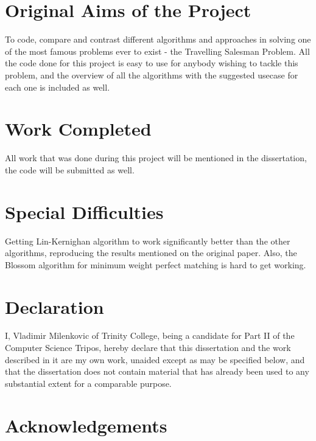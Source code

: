 \documentclass[12pt,twoside,notitlepage]{report}
\begin{document}
\section*{Original Aims of the Project}

To code, compare and contrast different algorithms and approaches in solving one of the most famous problems ever to exist - the Travelling Salesman Problem. All the code done for this project is easy to use for anybody wishing to tackle this problem, and the overview of all the algorithms with the suggested usecase for each one is included as well.


\section*{Work Completed}

All work that was done during this project will be mentioned in the dissertation, the code will be submitted as well.

\section*{Special Difficulties}

Getting Lin-Kernighan algorithm to work significantly better than the other algorithms, reproducing the results mentioned on the original paper. Also, the Blossom algorithm for minimum weight perfect matching is hard to get working. %
 
\newpage
\section*{Declaration}

I, Vladimir Milenkovic of Trinity College, being a candidate for Part II of the Computer
Science Tripos, hereby declare
that this dissertation and the work described in it are my own work,
unaided except as may be specified below, and that the dissertation
does not contain material that has already been used to any substantial
extent for a comparable purpose.

\bigskip
{}

\medskip
{} %

\cleardoublepage

\tableofcontents

\listoffigures

\newpage
\section*{Acknowledgements}
\end{document}
